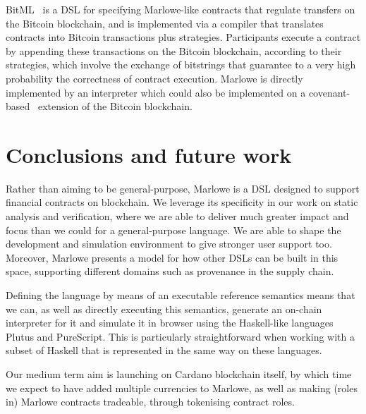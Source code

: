 \documentclass[runningheads]{llncs}
\begin{document}
BitML~\cite{BitML} is a DSL for specifying Marlowe-like contracts that regulate transfers on the Bitcoin blockchain, and is implemented via a compiler that translates contracts into  Bitcoin transactions plus strategies. Participants execute a contract by appending these transactions on the Bitcoin blockchain, according to their strategies, which involve the exchange of bitstrings that guarantee to a very high probability the correctness of contract execution. Marlowe is directly implemented by an interpreter which could also be implemented on a covenant-based~\cite{covenants} extension of the Bitcoin blockchain.



\section{Conclusions and future work}

Rather than aiming to be general-purpose, Marlowe is a DSL designed to support financial contracts on blockchain. We leverage its specificity in our work on static analysis and verification, where we are able to deliver much greater impact and focus than we could for a general-purpose language. We are able to shape the development and simulation environment to give stronger user support too. Moreover, Marlowe  presents a model for how other DSLs can be built in this space, supporting different domains such as provenance in the supply chain. 

Defining the language by means of an executable reference semantics means that we can, as well as directly executing this semantics, generate an on-chain interpreter for it and simulate it in browser using the Haskell-like languages Plutus and PureScript. This is particularly straightforward when working with a subset of Haskell that is represented in the same way on these languages.

Our medium term aim is launching on Cardano blockchain itself, by which time we expect to have added multiple currencies to Marlowe, as well as making (roles in) Marlowe contracts tradeable, through tokenising contract roles.


%
%
%


%
\end{document}
